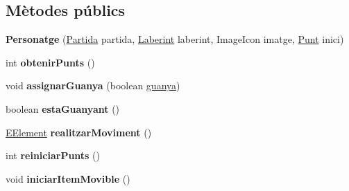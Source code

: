 \subsection*{Mètodes públics}
\begin{DoxyCompactItemize}
\item 
\hypertarget{classlogica_1_1_personatge_af207e20f6a0494a46e710d8c9f33ccff}{{\bfseries Personatge} (\hyperlink{classlogica_1_1_partida}{Partida} partida, \hyperlink{classlogica_1_1laberints_1_1_laberint}{Laberint} laberint, Image\+Icon imatge, \hyperlink{classlogica_1_1_punt}{Punt} inici)}\label{classlogica_1_1_personatge_af207e20f6a0494a46e710d8c9f33ccff}

\item 
\hypertarget{classlogica_1_1_personatge_a9c68a159bb580a73ae28ce692ab5c92d}{int {\bfseries obtenir\+Punts} ()}\label{classlogica_1_1_personatge_a9c68a159bb580a73ae28ce692ab5c92d}

\item 
\hypertarget{classlogica_1_1_personatge_a32871fa2793634b05a0973ceec438560}{void {\bfseries assignar\+Guanya} (boolean \hyperlink{classlogica_1_1_personatge_a0c30dc6ca85f941043ae4a27e7583c67}{guanya})}\label{classlogica_1_1_personatge_a32871fa2793634b05a0973ceec438560}

\item 
\hypertarget{classlogica_1_1_personatge_a45c54c34068a2d0c0ee47c0222c6d6c8}{boolean {\bfseries esta\+Guanyant} ()}\label{classlogica_1_1_personatge_a45c54c34068a2d0c0ee47c0222c6d6c8}

\item 
\hypertarget{classlogica_1_1_personatge_a39387dbfebd1936e63c29c8a9dd85bb1}{\hyperlink{enumlogica_1_1enumeracions_1_1_e_element}{E\+Element} {\bfseries realitzar\+Moviment} ()}\label{classlogica_1_1_personatge_a39387dbfebd1936e63c29c8a9dd85bb1}

\item 
\hypertarget{classlogica_1_1_personatge_afed860920a63cbd1efe126315a7370f4}{int {\bfseries reiniciar\+Punts} ()}\label{classlogica_1_1_personatge_afed860920a63cbd1efe126315a7370f4}

\item 
\hypertarget{classlogica_1_1_personatge_a5f171d79a5a8ca6d0184a250456c44d1}{void {\bfseries iniciar\+Item\+Movible} ()}\label{classlogica_1_1_personatge_a5f171d79a5a8ca6d0184a250456c44d1}

\end{DoxyCompactItemize}
